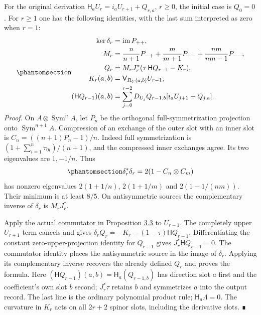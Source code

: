 \documentclass[
  english,
  11pt,
  reqno]{amsart}
\begin{document}
For the original derivation \(\mathsf H_aU_r=i_aU_{r+1}+Q_{r,a}\),
\(r\ge0\), the initial case is \(Q_0=0\). For \(r\ge1\) one has the
following identities, with the last sum interpreted as zero when
\(r=1\): \begin{equation}\protect\phantomsection\label{eq:es-recursion}{
 \begin{aligned}
 \ker\delta_r&=\operatorname{im}P_{++},\\
 M_r&=\frac n{n+1}P_{-+}+\frac m{m+1}P_{+-}
                         +\frac{nm}{nm-1}P_{--},\\
 Q_r&=M_rJ_r^*(\tau\,\mathsf H Q_{r-1}-K_r),\\
 K_r(a,b)&=\mathsf V_{R_U(a,b)}U_{r-1},\\
 (\mathsf H Q_{r-1})(a,b)
  &=\sum_{j=0}^{r-2}D_{U_j}Q_{r-1,b}
                         [i_aU_{j+1}+Q_{j,a}].
 \end{aligned}
}\end{equation} \emph{Proof.} On \(A\otimes\operatorname{Sym}^nA\), let
\(P_n\) be the orthogonal full-symmetrization projection onto
\(\operatorname{Sym}^{n+1}A\). Compression of an exchange of the outer
slot with an inner slot is \(C_n=((n+1)P_n-1)/n\). Indeed full
symmetrization is \((1+\sum_{i=1}^n\tau_{0i})/(n+1)\), and the
compressed inner exchanges agree. Its two eigenvalues are \(1,-1/n\).
Thus
\begin{equation}\protect\phantomsection\label{eq:es-spencer-spectrum}{
 \delta_r^*\delta_r=2(1-C_n\otimes C_m)
}\end{equation} has nonzero eigenvalues \(2(1+1/n)\), \(2(1+1/m)\) and
\(2(1-1/(nm))\). Their minimum is at least \(8/5\). On antisymmetric
sources the complementary inverse of \(\delta_r\) is \(M_rJ_r^*\).

Apply the actual commutator in Proposition
\hyperref[prop:es-polynomial-derivations]{3.3} to \(U_{r-1}\). The
completely upper \(U_{r+1}\) term cancels and gives
\(\delta_rQ_r=-K_r-(1-\tau)\mathsf H Q_{r-1}\). Differentiating the
constant zero-upper-projection identity for \(Q_{r-1}\) gives
\(J_r^*\mathsf H Q_{r-1}=0\). The commutator identity places the
antisymmetric source in the image of \(\delta_r\). Applying its
complementary inverse recovers the already defined \(Q_r\) and proves
the formula. Here \((\mathsf H Q_{r-1})(a,b)=\mathsf H_a(Q_{r-1,b})\)
has direction slot \(a\) first and the coefficient's own slot \(b\)
second; \(J_r^*\tau\) retains \(b\) and symmetrizes \(a\) into the
output record. The last line is the ordinary polynomial product rule;
\(\mathsf H_a\Lambda=0\). The curvature in \(K_r\) acts on all \(2r+2\)
spinor slots, including the derivative slots. ∎
\end{document}
